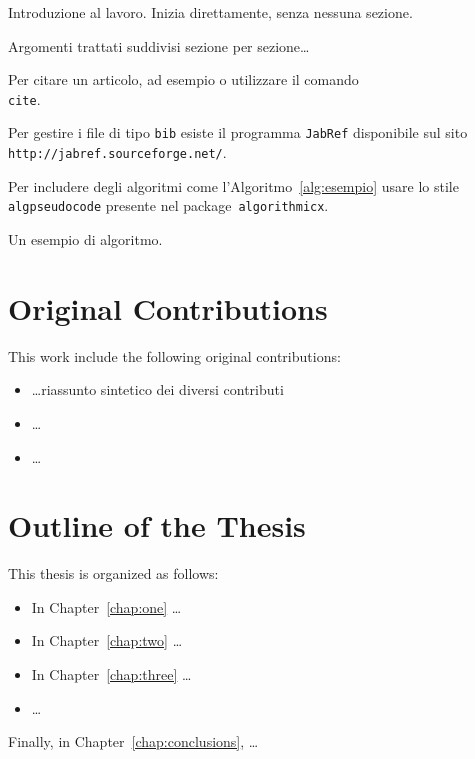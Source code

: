 Introduzione al lavoro. Inizia direttamente, senza nessuna sezione.

\noindent Argomenti trattati suddivisi sezione per sezione\dots

\noindent Per citare un articolo, ad esempio \cite{book:projpa2} o \cite{online:azuretable, online:datastore} utilizzare il comando \texttt{\\cite}. 

\noindent Per gestire i file di tipo \texttt{bib} esiste il programma \texttt{JabRef} disponibile sul sito \texttt{http://jabref.sourceforge.net/}.

\noindent Per includere degli algoritmi come l'Algoritmo~\ref{alg:esempio}
usare lo stile \texttt{algpseudocode} presente nel package~\texttt{algorithmicx}.

\begin{algorithm}[h]
  
  \caption{Un esempio di algoritmo.}
  \label{alg:esempio}
\end{algorithm}

\section*{Original Contributions}
This work include the following original contributions:
\begin{itemize}
\item \dots riassunto sintetico dei diversi contributi
\item \dots
\item \dots
\end{itemize}

\section*{Outline of the Thesis}
This thesis is organized as follows: 
\begin{itemize}
\item In Chapter~\ref{chap:one} \dots
\item In Chapter~\ref{chap:two} \dots
\item In Chapter~\ref{chap:three} \dots
\item \dots
\end{itemize}
Finally, in Chapter~\ref{chap:conclusions}, \dots


